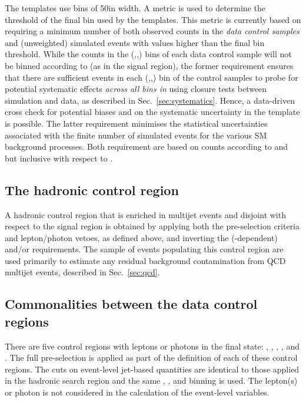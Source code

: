 The templates use \mht bins of 50\gev in width. A metric is used to
determine the threshold of the final \mht bin used by the
templates. This metric is currently based on requiring a minimum
number of both observed counts in the {\it data control samples} and
(unweighted) simulated events with \mht values higher than the final
bin threshold. While the counts in the (\njet,\nb,\HT) bins of each
data control sample will not be binned according to \mht (as in the
signal region), the former requirement ensures that there are
sufficient events in each (\njet,\nb,\HT) bin of the control samples
to probe for potential systematic effects {\it across all bins in
  \mht} using closure tests between simulation and data, as described
in Sec.~\ref{sec:systematics}. Hence, a data-driven cross check for
potential biases and on the systematic uncertainty in the \mht
template is possible. The latter requirement minimises the statistical
uncertainties associated with the finite number of simulated events
for the various SM background processes. Both requirement are based on
counts according to \njet and \nb but inclusive with respect to \nb.

\subsection{The hadronic control region}

A hadronic control region that is enriched in multijet events and
disjoint with respect to the signal region is obtained by applying
both the pre-selection criteria and lepton/photon vetoes, as defined
above, and inverting the (\HT-dependent) \alphat and/or \mhtmet
requirements. 
The sample of events populating this control region are used primarily
to estimate any residual background contamination from QCD multijet
events, described in Sec.~\ref{sec:qcd}.

\subsection{Commonalities between the data control regions}

There are five control regions with leptons or photons in the final
state: \mj, \mmj, \ej, \eej, and \gj. The full pre-selection is
applied as part of the definition of each of these control
regions. The cuts on event-level jet-based quantities are identical to
those applied in the hadronic search region and the same \njet, \nb,
and \scalht binning is used. The lepton(s) or photon is not considered
in the calculation of the event-level variables.

